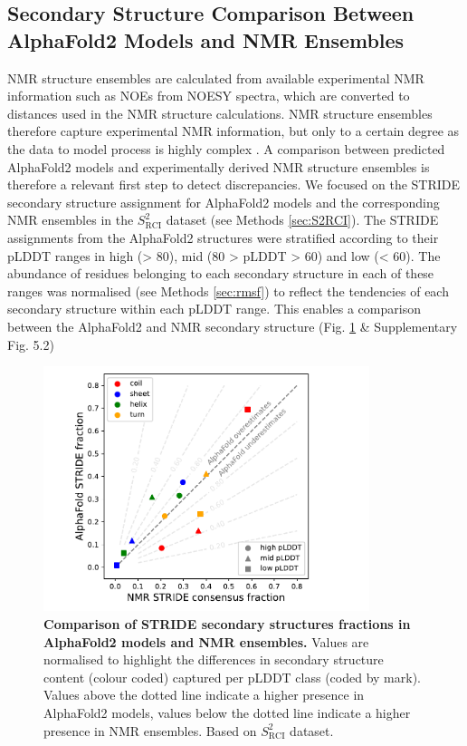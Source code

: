 \subsection{Secondary Structure Comparison Between AlphaFold2 Models and NMR Ensembles}

NMR structure ensembles are calculated from available experimental NMR information such as NOEs from NOESY spectra, which are converted to distances used in the NMR structure calculations. NMR structure ensembles therefore capture experimental NMR information, but only to a certain degree as the data to model process is highly complex \cite{vranken_nmr_2014}. A comparison between predicted AlphaFold2 models and experimentally derived NMR structure ensembles is therefore a relevant first step to detect discrepancies. We focused on the STRIDE \cite{frishman_knowledge-based_1995, lovell_structure_2003} secondary structure assignment for AlphaFold2 models and the corresponding NMR ensembles in the $S^{2}_{\text{RCI}}$ dataset (see Methods \ref{sec:S2RCI}). The STRIDE assignments from the AlphaFold2 structures were stratified according to their pLDDT ranges in high (> 80), mid (80 > pLDDT > 60) and low (< 60). The abundance of residues belonging to each secondary structure in each of these ranges was normalised (see Methods \ref{sec:rmsf}) to reflect the tendencies of each secondary structure within each pLDDT range. This enables a comparison between the AlphaFold2 and NMR secondary structure (Fig. \ref{fig:ss_comparison_scatter_normalised} \& Supplementary Fig. 5.2)

\begin{figure}[htb]
    \centering
    \includegraphics[width=0.85\textwidth]{pLDDT/plddt_figures/scatter_plddt_regions_per_ss_type_abundance_deviation_only_normalised_af_stride_af_ss_nmr_strideCons.pdf}
    \caption{
    \textbf{Comparison of STRIDE secondary structures fractions in AlphaFold2 models and NMR ensembles.} 
    Values are normalised to highlight the differences in secondary structure content (colour coded) captured per pLDDT class (coded by mark). Values above the dotted line indicate a higher presence in AlphaFold2 models, values below the dotted line indicate a higher presence in NMR ensembles.
    Based on $S^2_{\text{RCI}}$ dataset.}
    \label{fig:ss_comparison_scatter_normalised}
\end{figure}

